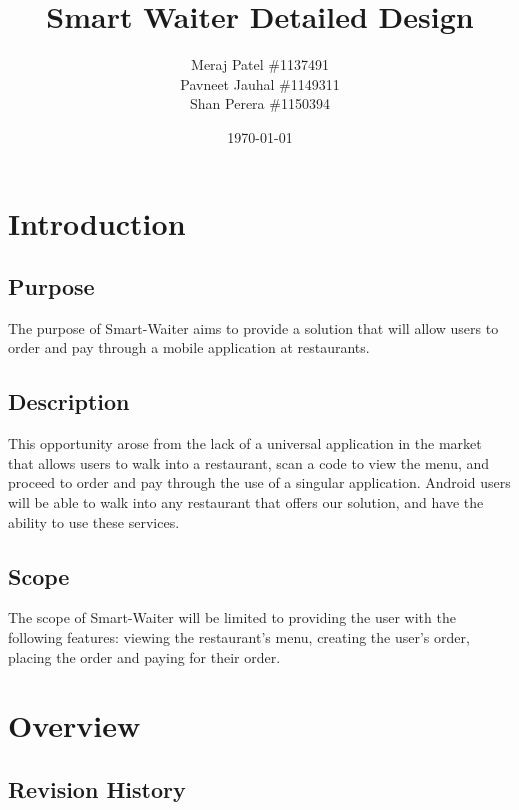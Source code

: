 \documentclass[12pt, titlepage]{article}
\begin{document}
\title{Smart Waiter Detailed Design} 
\author{Meraj Patel \#1137491 \\ Pavneet Jauhal \#1149311\\ Shan Perera \#1150394}
\date{\today}
\maketitle

\tableofcontents 

\listoffigures

\listoftables


\pagebreak

\section{Introduction}

\subsection{Purpose}
The purpose of Smart-Waiter aims to provide a solution that will allow users to order and pay through a mobile application at restaurants.

\subsection{Description}
This opportunity arose from the lack of a universal application in the market that allows users to walk into a restaurant, scan a code to view the menu, and proceed to order and pay through the use of a singular application. Android users will be able to walk into any restaurant that offers our solution, and have the ability to use these services.

\subsection{Scope}
The scope of Smart-Waiter will be limited to providing the user with the following features: viewing the restaurant's menu, creating the user's order, placing the order and paying for their order. 

\section{Overview}
\subsection{Revision History}
\end{document}
